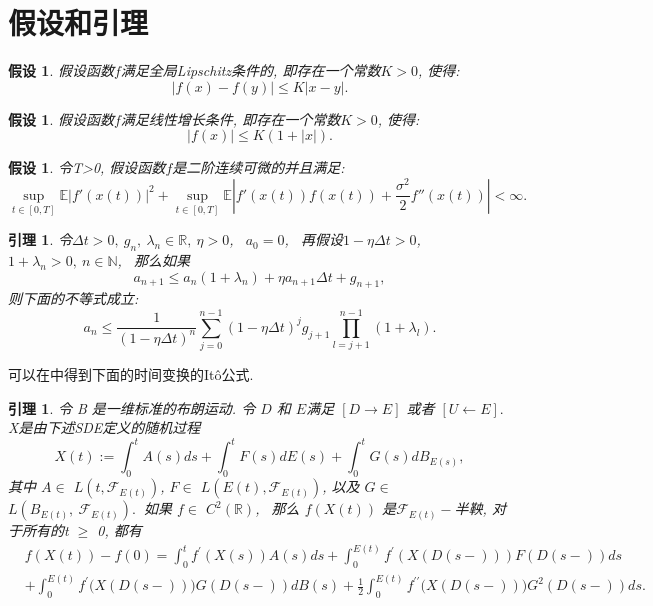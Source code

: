 \documentclass[12pt, final]{article}
\numberwithin{equation}{section}
\numberwithin{figure}{section}
\numberwithin{table}{section}
\theoremstyle{plain}
\newtheorem{Lemma}[Theorem]{引理}      %
\newtheorem{Assumption}[Theorem]{假设} %
\theoremstyle{Definition}
\theoremstyle{Remark}
\begin{document}
	
	\section{假设和引理}
	\begin{Assumption}\label{Lipschitz}
		假设函数$f$满足全局\textnormal{Lipschitz}条件的, 即存在一个常数$K>0$, 使得:
		\begin{equation}
			|f(x)-f(y)| \le K|x-y|. 
		\end{equation}
	\end{Assumption}
	
	\begin{Assumption}\label{linear growth}
		假设函数$f$满足线性增长条件, 即存在一个常数$K>0$, 使得:
		\begin{equation}
			|f(x)| \le K(1+|x|). 
		\end{equation}
	\end{Assumption}
	
	\begin{Assumption}\label{moment}
		令T>0, 假设函数$f$是二阶连续可微的并且满足:
		\begin{equation}
			\sup\limits_{t\in[0, T]}\mathbb{E}\left|f'(x(t))\right|^2+
			\sup\limits_{t\in[0, T]}\mathbb{E}\left|f'(x(t))f(x(t))+
			\frac{\sigma^2}2f''(x(t))\right|<\infty. 
		\end{equation}
	\end{Assumption}
	
	\begin{Lemma}\label{gronwall}
		令$\Delta t > 0, ~g_n, ~\lambda _n \in \mathbb{R}, ~\eta > 0$, ~$a_0=0$, ~再假设$1-\eta \Delta t > 0$, ~$1 + \lambda _n > 0, ~n \in \mathbb{N}$, ~那么如果
		\begin{equation*}
			a_{n+1} \leq a_n(1+\lambda _n)+\eta a_{n+1}\Delta t +g_{n+1}, 
		\end{equation*}
		则下面的不等式成立:
		\begin{equation}
			a_n \leq \frac{1}{(1-\eta\Delta t)^n}\sum\limits_{j=0}^{n-1}(1-\eta\Delta t)^jg_{j+1}\prod\limits_{l=j+1}^{n-1}(1+\lambda _l). 
		\end{equation}
	\end{Lemma}
	
	
	可以在\cite{umarov2018beyond}中得到下面的时间变换的It\^{o}公式. 
	\begin{Lemma}\label{ito}
		令 B 是一维标准的布朗运动. 令 $D$ 和 $E$满足 $[ D\longrightarrow E]$ 或者 $[ U\longleftarrow E]. $ X是由下述\textnormal{SDE}定义的随机过程
		$$X{(t)}:=\int_0^tA{(s)}ds+\int_0^tF{(s)}dE{(s)}+\int_0^tG{(s)}dB_{E{(s)}}, $$
		其中 $A\in$ $L( t, \mathcal{F} _{E{(t)}})$, $F\in$ $L( E{(t)}, \mathcal{F} _{E{(t)}})$, 以及 $G\in$ $L( B_{E{(t)}}, ~\mathcal{F} _{E{(t)}}) . ~$ 如果 $f\in$ $C^2( \mathbb{R} )$, ~那么
		$f(X(t))$ 是$\mathcal{F}_{E{(t)}}-$半鞅, 对于所有的t $\ge$ 0, 都有
		$$\begin{aligned}
			&f(X{(t)})-f(0)=\int_{0}^{t}f^{\prime}(X{(s)})A{(s)}ds+\int_{0}^{E{(t)}}f^{\prime}\left(X(D(s-))\right)F(D(s-))ds\\
			&+\int_{0}^{E{(t)}}f^{\prime}\big(X(D(s-))\big)G(D(s-))dB{(s)}+\frac{1}{2}\int_{0}^{E{(t)}}f^{\prime\prime}\big(X(D(s-))\big)G^2(D(s-))ds. 
		\end{aligned}$$
	\end{Lemma}
	
\end{document}
